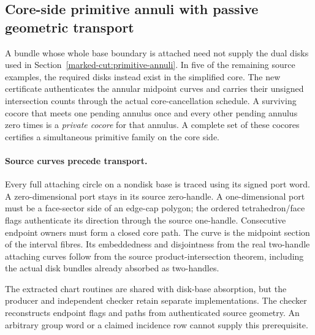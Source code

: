 \subsection{Core-side primitive annuli with passive geometric transport}
\label{marked-cut:core-annuli}

A bundle whose whole base boundary is attached need not supply the dual disks
used in Section~\ref{marked-cut:primitive-annuli}. In five of the remaining
source examples, the required disks instead exist in the simplified core.
The new certificate authenticates the annular midpoint curves and carries
their unsigned intersection counts through the actual core-cancellation
schedule. A surviving cocore that meets one pending annulus once and every
other pending annulus zero times is a \emph{private cocore} for that annulus.
A complete set of these cocores certifies a simultaneous primitive family
on the core side.

\paragraph{Source curves precede transport.}
Every full attaching circle on a nondisk base is traced using its signed
port word. A zero-dimensional port stays in its source zero-handle. A
one-dimensional port must be a face-sector side of an edge-cap polygon;
the ordered tetrahedron/face flags authenticate its direction through the
source one-handle. Consecutive endpoint owners must form a closed core path.
The curve is the midpoint section of the interval fibres. Its embeddedness
and disjointness from the real two-handle attaching curves follow from the
source product-intersection theorem, including the actual disk bundles
already absorbed as two-handles.

The extracted chart routines are shared with disk-base absorption, but the
producer and independent checker retain separate implementations. The
checker reconstructs endpoint flags and paths from authenticated source
geometry. An arbitrary group word or a claimed incidence row cannot supply
this prerequisite.

